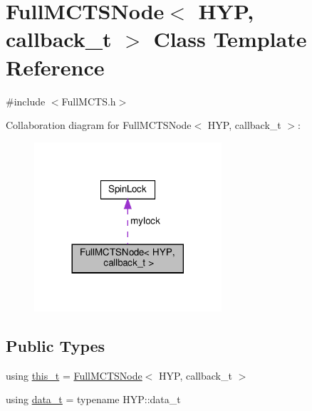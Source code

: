 \hypertarget{class_full_m_c_t_s_node}{}\section{Full\+M\+C\+T\+S\+Node$<$ H\+YP, callback\+\_\+t $>$ Class Template Reference}
\label{class_full_m_c_t_s_node}


{\ttfamily \#include $<$Full\+M\+C\+T\+S.\+h$>$}



Collaboration diagram for Full\+M\+C\+T\+S\+Node$<$ H\+YP, callback\+\_\+t $>$\+:
\nopagebreak
\begin{figure}[H]
\begin{center}
\leavevmode
\includegraphics[width=197pt]{class_full_m_c_t_s_node__coll__graph}
\end{center}
\end{figure}
\subsection*{Public Types}
\begin{DoxyCompactItemize}
\item 
using \hyperlink{class_full_m_c_t_s_node_afcc6a60f2d45fd1d6c4bd5f4998b147d}{this\+\_\+t} = \hyperlink{class_full_m_c_t_s_node}{Full\+M\+C\+T\+S\+Node}$<$ H\+YP, callback\+\_\+t $>$
\item 
using \hyperlink{class_full_m_c_t_s_node_a9c9c98180d9c5a799f118a79976536a6}{data\+\_\+t} = typename H\+Y\+P\+::data\+\_\+t
\end{DoxyCompactItemize}
